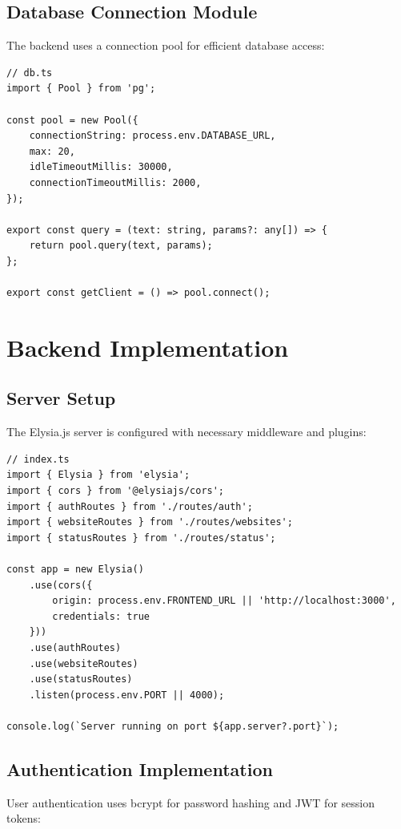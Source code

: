 \subsection{Database Connection Module}

The backend uses a connection pool for efficient database access:

\begin{verbatim}
// db.ts
import { Pool } from 'pg';

const pool = new Pool({
    connectionString: process.env.DATABASE_URL,
    max: 20,
    idleTimeoutMillis: 30000,
    connectionTimeoutMillis: 2000,
});

export const query = (text: string, params?: any[]) => {
    return pool.query(text, params);
};

export const getClient = () => pool.connect();
\end{verbatim}

\section{Backend Implementation}

\subsection{Server Setup}

The Elysia.js server is configured with necessary middleware and plugins:

\begin{verbatim}
// index.ts
import { Elysia } from 'elysia';
import { cors } from '@elysiajs/cors';
import { authRoutes } from './routes/auth';
import { websiteRoutes } from './routes/websites';
import { statusRoutes } from './routes/status';

const app = new Elysia()
    .use(cors({
        origin: process.env.FRONTEND_URL || 'http://localhost:3000',
        credentials: true
    }))
    .use(authRoutes)
    .use(websiteRoutes)
    .use(statusRoutes)
    .listen(process.env.PORT || 4000);

console.log(`Server running on port ${app.server?.port}`);
\end{verbatim}

\subsection{Authentication Implementation}

User authentication uses bcrypt for password hashing and JWT for session tokens:

